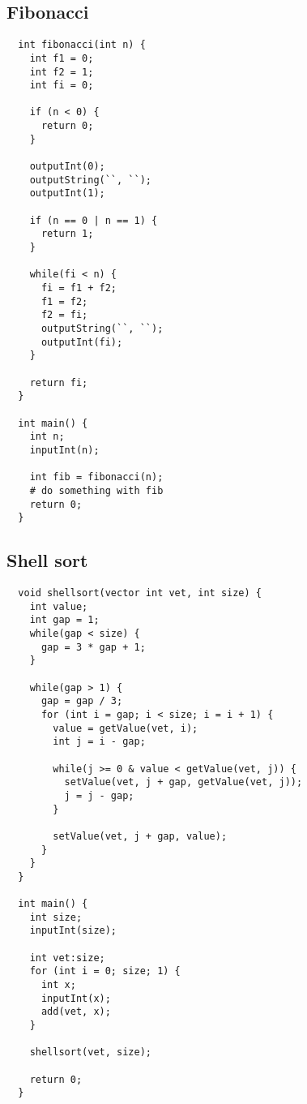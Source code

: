 \documentclass[a4paper, 11pt, article]{memoir}
\begin{document}
\subsection{Fibonacci}
\label{subsec:fibonacci}
\begin{lstlisting}
  int fibonacci(int n) {
    int f1 = 0;
    int f2 = 1;
    int fi = 0;

    if (n < 0) {
      return 0;
    }

    outputInt(0);
    outputString(``, ``);
    outputInt(1);

    if (n == 0 | n == 1) {
      return 1;
    }

    while(fi < n) {
      fi = f1 + f2;
      f1 = f2;
      f2 = fi;
      outputString(``, ``);
      outputInt(fi);
    }

    return fi;
  }

  int main() {
    int n;
    inputInt(n);

    int fib = fibonacci(n);
    # do something with fib
    return 0;
  }
\end{lstlisting}

\subsection{Shell sort}
\label{subsec:shelsort}
\begin{lstlisting}
  void shellsort(vector int vet, int size) {
    int value;
    int gap = 1;
    while(gap < size) {
      gap = 3 * gap + 1;
    }

    while(gap > 1) {
      gap = gap / 3;
      for (int i = gap; i < size; i = i + 1) {
        value = getValue(vet, i);
        int j = i - gap;

        while(j >= 0 & value < getValue(vet, j)) {
          setValue(vet, j + gap, getValue(vet, j));
          j = j - gap;
        }

        setValue(vet, j + gap, value);
      }
    }
  }

  int main() {
    int size;
    inputInt(size);

    int vet:size;
    for (int i = 0; size; 1) {
      int x;
      inputInt(x);
      add(vet, x);
    }

    shellsort(vet, size);

    return 0;
  }
\end{lstlisting}
\end{document}
